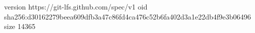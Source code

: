 version https://git-lfs.github.com/spec/v1
oid sha256:d30162279beea609dfb3a47c86fd4ca476c52b6fa402d3a1e22db4f9e3b06496
size 14365
